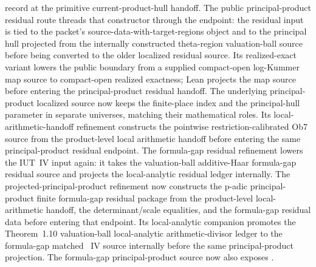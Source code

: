 \begin{proposition}
   record at the primitive
  current-product-hull handoff.
  The public principal-product residual route
  threads that constructor through the endpoint: the residual input is tied to
  the packet's source-data-with-target-regions object and to the
  principal hull projected from the internally constructed theta-region
  valuation-ball source before being converted to the older localized residual
  source.
  Its realized-exact variant
  lowers the public boundary from a supplied compact-open log-Kummer map
  source to compact-open realized exactness; Lean projects the map source
  before entering the principal-product residual handoff.  The underlying
  principal-product localized source now keeps the finite-place index and the
  principal-hull parameter in separate universes, matching their mathematical
  roles.  Its local-arithmetic-handoff refinement constructs the pointwise
  restriction-calibrated Ob7 source from the product-level local arithmetic
  handoff before entering the same principal-product residual endpoint.
  The formula-gap residual refinement lowers the IUT~IV input again: it takes
  the valuation-ball additive-Haar formula-gap residual source and projects
  the local-analytic residual ledger internally.
  The projected-principal-product refinement now constructs the p-adic
  principal-product finite formula-gap residual package from the product-level
  local-arithmetic handoff, the determinant/scale equalities, and the
  formula-gap residual data before entering that endpoint.
  Its local-analytic companion promotes the Theorem~1.10 valuation-ball
  local-analytic arithmetic-divisor ledger to the formula-gap matched
  \IUT{}~IV source internally before the same principal-product projection.
  The formula-gap principal-product source now also exposes
  .

\end{proposition}
